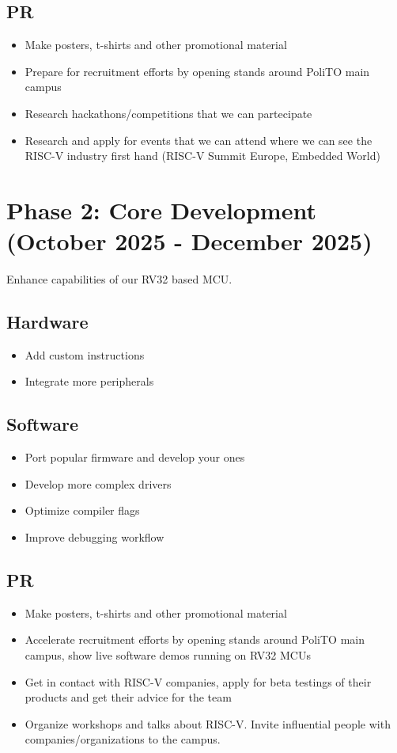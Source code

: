 \documentclass{article}
\begin{document}
\subsection{PR}
\begin{itemize}
    \item Make posters, t-shirts and other promotional material
    \item Prepare for recruitment efforts by opening stands around PoliTO main campus
    \item Research hackathons/competitions that we can partecipate
    \item Research and apply for events that we can attend where we can see the RISC-V industry first hand (RISC-V Summit Europe, Embedded World)
    
\end{itemize}

\section{Phase 2: Core Development (October 2025 - December 2025)}
Enhance capabilities of our RV32 based MCU.

\subsection{Hardware}
\begin{itemize}
    \item Add custom instructions
    \item Integrate more peripherals
\end{itemize}

\subsection{Software}
\begin{itemize}
    \item Port popular firmware and develop your ones
    \item Develop more complex drivers
    \item Optimize compiler flags
    \item Improve debugging workflow
\end{itemize}

\subsection{PR}
\begin{itemize}
    \item Make posters, t-shirts and other promotional material
    \item Accelerate recruitment efforts by opening stands around PoliTO main campus, show live software demos running on RV32 MCUs
    \item Get in contact with RISC-V companies, apply for beta testings of their products and get their advice for the team
    \item Organize workshops and talks about RISC-V. Invite influential people with companies/organizations to the campus.
\end{itemize}
\end{document}
